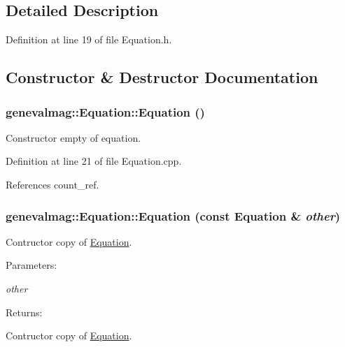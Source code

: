 \subsection{Detailed Description}


Definition at line 19 of file Equation.h.

\subsection{Constructor \& Destructor Documentation}
\hypertarget{classgenevalmag_1_1Equation_76d5ce9bfc75bcf3cee68e133d1d4faf}{
\subsubsection[{Equation}]{\setlength{\rightskip}{0pt plus 5cm}genevalmag::Equation::Equation ()}}
\label{classgenevalmag_1_1Equation_76d5ce9bfc75bcf3cee68e133d1d4faf}


Constructor empty of equation. 

Definition at line 21 of file Equation.cpp.

References count\_\-ref.\hypertarget{classgenevalmag_1_1Equation_82897cc7187c5c6f8cf1552387856f0f}{
\subsubsection[{Equation}]{\setlength{\rightskip}{0pt plus 5cm}genevalmag::Equation::Equation (const {\bf Equation} \& {\em other})}}
\label{classgenevalmag_1_1Equation_82897cc7187c5c6f8cf1552387856f0f}


Contructor copy of \hyperlink{classgenevalmag_1_1Equation}{Equation}. \begin{Desc}
\item[Parameters:]
\begin{description}
\item[{\em other}]\end{description}
\end{Desc}
\begin{Desc}
\item[Returns:]\end{Desc}
Contructor copy of \hyperlink{classgenevalmag_1_1Equation}{Equation}. 

